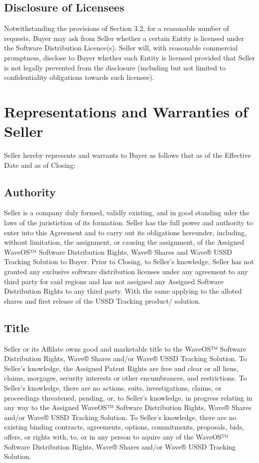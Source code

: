 \documentclass[letterpaper,10pt,english]{sphinxmanual}
\begin{document}
\subsection{Disclosure of Licensees}
\label{\detokenize{5-additionalobligations:disclosure-of-licensees}}
Notwithstanding the provisions of Section 3.2, for a reasonable number of requests, Buyer may ask from Seller whether a certain Entity is licensed under the Software Distribution Licence(s). Seller will, with reasonable commercial promptness, disclose to Buyer whether such Entity is licensed provided that Seller is not legally prevented from the disclosure (including but not limited to confidentiality obligations towards such licensee).


\section{Representations and Warranties of Seller}
\label{\detokenize{6-representations:representations-and-warranties-of-seller}}\label{\detokenize{6-representations::doc}}
Seller hereby represents and warrants to Buyer as follows that as of the Effective Date and as of Closing:


\subsection{Authority}
\label{\detokenize{6-representations:authority}}
Seller is a company duly formed, validly existing, and in good standing uder the laws of the juristiction of its formation. Seller has the full power and authority to enter into this Agreement and to carry out its obligations hereunder, including, without limitation, the assignment, or causing the assignment, of the Assigned WaveOS™ Software Distribution Rights, Wave® Shares and Wave® USSD Tracking Solution to Buyer. Prior to Closing, to Seller’s knowledge, Seller has not granted any exclusive software distribution licenses under any agreement to any third party for said regions and has not assigned any Assigned Software Distribution Rights to any third party. With the same applying to the alloted shares and first release of the USSD Tracking product/ solution.


\subsection{Title}
\label{\detokenize{6-representations:title}}
Seller or its Affilate owns good and marketable title to the WaveOS™ Software Distribution Rights, Wave® Shares and/or Wave® USSD Tracking Solution. To Seller’s knowledge, the Assigned Patent Rights are free and clear or all liens, claims, morgages, security interests or other encumbrances, and restrictions. To Seller’s knowledge, there are no actions, suits, investigations, claims, or proceedings threatened, pending, or, to Seller’s knowledge, in progress relating in any way to the Assigned WaveOS™ Software Distribution Rights, Wave® Shares and/or Wave® USSD Tracking Solution. To Seller’s knowledge, there are no existing binding contracts, agreements, options, commitments, proposals, bids, offers, or rights with, to, or in any person to aquire any of the WaveOS™ Software Distribution Rights, Wave® Shares and/or Wave® USSD Tracking Solution.
\end{document}
